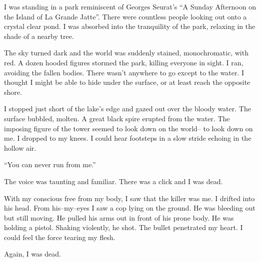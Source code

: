 \noindent
I was standing in a park reminiscent of
Georges Seurat's ``A Sunday Afternoon on the Island of La Grande Jatte''.
There were countless people looking out onto a crystal clear pond.
I was absorbed into the tranquility of the park,
relaxing in the shade of a nearby tree.


The sky turned dark and the world was suddenly stained, monochromatic, with red.
A dozen hooded figures stormed the park, killing everyone in sight.
I ran, avoiding the fallen bodies.
There wasn't anywhere to go except to the water.
I thought I might be able to hide under the surface, or at least reach
the opposite shore.


I stopped just short of the lake's edge and gazed out over the bloody water.
The surface bubbled, molten.
A great black spire erupted from the water.
The imposing figure of the tower seemed to look down on the world--
to look down on me.
I dropped to my knees.
I could hear footsteps in a slow stride echoing in the hollow air.
\VV


``You can never run from me.''
\VV


\noindent
The voice was taunting and familiar.
There was a click and I was dead.
\VV


\noindent
With my conscious free from my body, I saw that the killer was me.
I drifted into his head.  From his--my--eyes I saw a cop lying on the ground.
He was bleeding out but still moving.  He pulled his arms out in front of his
prone body.  He was holding a pistol.  Shaking violently, he shot.
The bullet penetrated my heart.  I could feel the force tearing my flesh.
\VV


\noindent
Again, I was dead.

